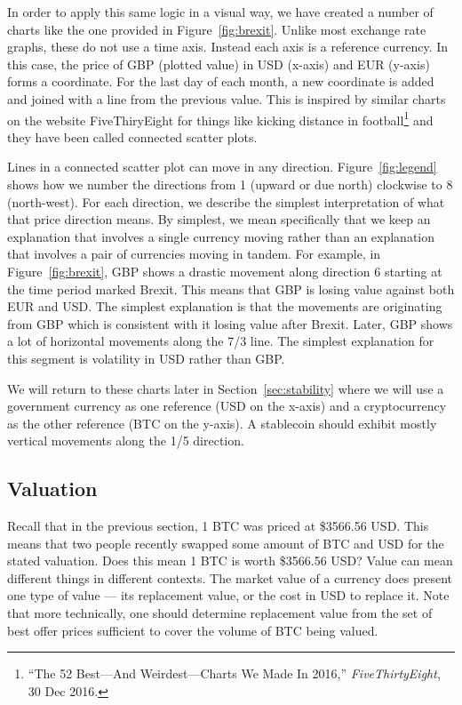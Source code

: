 In order to apply this same logic in a visual way, we have created a number of charts like the one provided in Figure~\ref{fig:brexit}. Unlike most exchange rate graphs, these do not use a time axis. Instead each axis is a reference currency. In this case, the price of GBP (plotted value) in USD (x-axis) and EUR (y-axis) forms a coordinate. For the last day of each month, a new coordinate is added and joined with a line from the previous value. This is inspired by similar charts on the website FiveThiryEight for things like kicking distance in football\footnote{``The 52 Best---And Weirdest---Charts We Made In 2016,'' \textit{FiveThirtyEight}, 30 Dec 2016.} and they have been called connected scatter plots.

Lines in a connected scatter plot can move in any direction. Figure~\ref{fig:legend} shows how we number the directions from 1 (upward or due north) clockwise to 8 (north-west). For each direction, we describe the simplest interpretation of what that price direction means. By simplest, we mean specifically that we keep an explanation that involves a single currency moving rather than an explanation that involves a pair of currencies moving in tandem. For example, in Figure~\ref{fig:brexit}, GBP shows a drastic movement along direction 6 starting at the time period marked Brexit. This means that GBP is losing value against both EUR and USD. The simplest explanation is that the movements are originating from GBP which is consistent with it losing value after Brexit. Later, GBP shows a lot of horizontal movements along the 7/3 line. The simplest explanation for this segment is volatility in USD rather than GBP.

We will return to these charts later in Section~\ref{sec:stability} where we will use a government currency as one reference (USD on the x-axis) and a cryptocurrency as the other reference (BTC on the y-axis). A stablecoin should exhibit mostly vertical movements along the 1/5 direction.

\subsection{Valuation}

Recall that in the previous section, 1 BTC was priced at \$3566.56 USD. This means that two people recently swapped some amount of BTC and USD for the stated valuation. Does this mean 1 BTC is worth \$3566.56 USD? Value can mean different things in different contexts. The market value of a currency does present one type of value --- its replacement value, or the cost in USD to replace it. Note that more technically, one should  determine replacement value from the set of best offer prices sufficient to cover the volume of BTC being valued.


